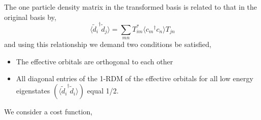 \documentclass[prl,12pt,onecolumn,nofootinbib,notitlepage,english,superscriptaddress]{revtex4-1}
\begin{document}
The one particle density matrix in the transformed basis is related 
to that in the original basis by,
\begin{equation}
	\langle {\tilde{d}_i}^{\dagger} \tilde{d}_{j} \rangle = \sum_{mn} T^{*}_{im} \langle {c_m}^{\dagger} c_n \rangle T_{jn}
\end{equation}
and using this relationship we demand two conditions be satisfied,
\begin{itemize} 
 \item The effective orbitals are orthogonal to each other 
 \item All diagonal entries of the 1-RDM of the effective orbitals for all low energy eigenstates 
       $(\langle {\tilde{d}_i}^{\dagger} \tilde{d}_{i} \rangle)$ 
       equal 1/2.
\end{itemize} 
We consider a cost function, 
\end{document}
